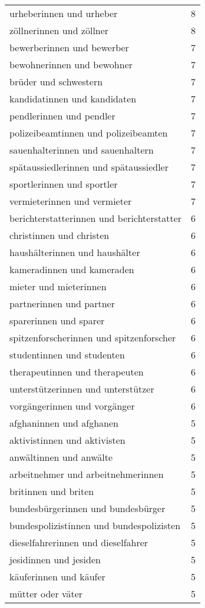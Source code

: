 \begin{tabular}{ll}
urheberinnen und urheber & 8\\
zöllnerinnen und zöllner & 8\\
bewerberinnen und bewerber & 7\\
bewohnerinnen und bewohner & 7\\
brüder und schwestern & 7\\
kandidatinnen und kandidaten & 7\\
pendlerinnen und pendler & 7\\
polizeibeamtinnen und polizeibeamten & 7\\
sauenhalterinnen und sauenhaltern & 7\\
spätaussiedlerinnen und spätaussiedler & 7\\
sportlerinnen und sportler & 7\\
vermieterinnen und vermieter & 7\\
berichterstatterinnen und berichterstatter & 6\\
christinnen und christen & 6\\
haushälterinnen und haushälter & 6\\
kameradinnen und kameraden & 6\\
mieter und mieterinnen & 6\\
partnerinnen und partner & 6\\
sparerinnen und sparer & 6\\
spitzenforscherinnen und spitzenforscher & 6\\
studentinnen und studenten & 6\\
therapeutinnen und therapeuten & 6\\
unterstützerinnen und unterstützer & 6\\
vorgängerinnen und vorgänger & 6\\
afghaninnen und afghanen & 5\\
aktivistinnen und aktivisten & 5\\
anwältinnen und anwälte & 5\\
arbeitnehmer und arbeitnehmerinnen & 5\\
britinnen und briten & 5\\
bundesbürgerinnen und bundesbürger & 5\\
bundespolizistinnen und bundespolizisten & 5\\
dieselfahrerinnen und dieselfahrer & 5\\
jesidinnen und jesiden & 5\\
käuferinnen und käufer & 5\\
mütter oder väter & 5\\

\end{tabular}
